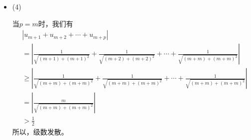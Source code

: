 \documentclass{article}
\begin{document}
\begin{itemize}
        我们有
        \begin{align*}
          |u_{m + 1} + u_{m + 2} + \cdots + u_{m + p}|
           & = \left|\frac{(-1)^{m + 1}}{m+1} + \frac{(-1)^{m + 2}}{m+2} + \cdots + \frac{(-1)^{m + p}}{m+p}\right|              \\
           & = \left|(-1)^{m + 1} (\frac{1}{m + 1} - \frac{1}{m + 2} + \cdots + \frac{(-1)^{p-1}}{m + p})\right|                 \\
           & = \left|\frac{1}{m + 1} - \frac{1}{m + 2} + \cdots + \frac{(-1)^{p-1}}{m + p}\right|                                \\
           & = \left|\frac{1}{m + 1} - \left(\frac{1}{m + 2} - \frac{1}{m + 3} + \cdots + \frac{(-1)^{p-2}}{m + p}\right)\right|
        \end{align*}
        因为
        \begin{align*}
           & \frac{1}{m + 2} - \frac{1}{m + 3} + \cdots + \frac{(-1)^{p-2}}{m + p}                                           \\
           & = (\frac{1}{m + 2} - \frac{1}{m + 3}) + (\frac{1}{m + 4} - \frac{1}{m + 5}) + \cdots + \frac{(-1)^{p-2}}{m + p} \\
           & > 0
        \end{align*}
        所以
        \begin{align*}
          \left|\frac{1}{m + 1} - \left(\frac{1}{m + 2} - \frac{1}{m + 3} + \cdots + \frac{(-1)^{p-2}}{m + p}\right)\right|
          < \frac{1}{m + 1}
        \end{align*}
        于是对任意$\epsilon > 0$，取$N = \frac{1}{\epsilon} - 1$，当$m > N$时，我们有$\frac{1}{m + 1} < \epsilon$。

  \item (4)

        当$p = m$时，我们有
        \begin{align*}
           & |u_{m + 1} + u_{m + 2} + \cdots + u_{m + p}|                                                                                                    \\
           & = \left| \frac{1}{\sqrt{(m + 1) + (m + 1)^2}} + \frac{1}{\sqrt{(m + 2) + (m + 2)^2}} + \cdots + \frac{1}{\sqrt{(m + m) + (m + m)^2}} \right|    \\
           & \geq \left| \frac{1}{\sqrt{(m + m) + (m + m)^2}} + \frac{1}{\sqrt{(m + m) + (m + m)^2}} + \cdots + \frac{1}{\sqrt{(m + m) + (m + m)^2}} \right| \\
           & = \left| \frac{m}{\sqrt{(m + m) + (m + m)^2}} \right|                                                                                           \\
           & > \frac{1}{2}
        \end{align*}
        所以，级数发散。
\end{itemize}
\end{document}
